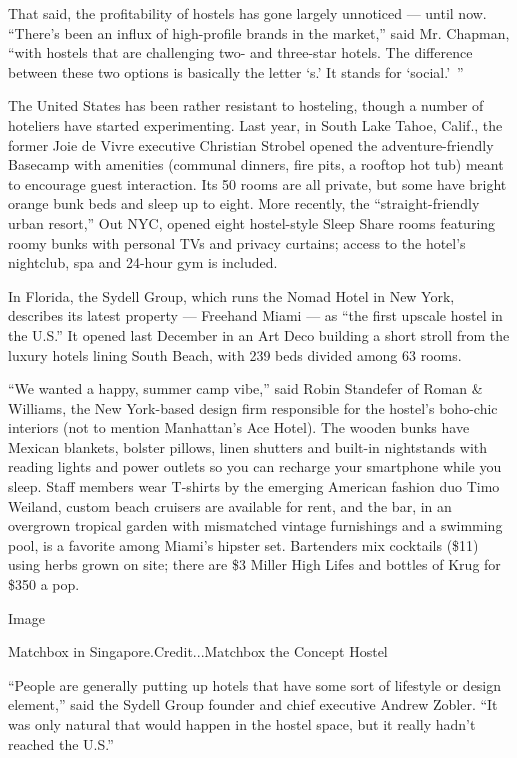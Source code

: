 That said, the profitability of hostels has gone largely unnoticed ---
until now. ``There's been an influx of high-profile brands in the
market,'' said Mr. Chapman, ``with hostels that are challenging two- and
three-star hotels. The difference between these two options is basically
the letter `s.' It stands for `social.'~''

The United States has been rather resistant to hosteling, though a
number of hoteliers have started experimenting. Last year, in South Lake
Tahoe, Calif., the former Joie de Vivre executive Christian Strobel
opened the adventure-friendly Basecamp with amenities (communal dinners,
fire pits, a rooftop hot tub) meant to encourage guest interaction. Its
50 rooms are all private, but some have bright orange bunk beds and
sleep up to eight. More recently, the ``straight-friendly urban
resort,'' Out NYC, opened eight hostel-style Sleep Share rooms featuring
roomy bunks with personal TVs and privacy curtains; access to the
hotel's nightclub, spa and 24-hour gym is included.

In Florida, the Sydell Group, which runs the Nomad Hotel in New York,
describes its latest property --- Freehand Miami --- as ``the first
upscale hostel in the U.S.'' It opened last December in an Art Deco
building a short stroll from the luxury hotels lining South Beach, with
239 beds divided among 63 rooms.

``We wanted a happy, summer camp vibe,'' said Robin Standefer of Roman
\& Williams, the New York-based design firm responsible for the hostel's
boho-chic interiors (not to mention Manhattan's Ace Hotel). The wooden
bunks have Mexican blankets, bolster pillows, linen shutters and
built-in nightstands with reading lights and power outlets so you can
recharge your smartphone while you sleep. Staff members wear T-shirts by
the emerging American fashion duo Timo Weiland, custom beach cruisers
are available for rent, and the bar, in an overgrown tropical garden
with mismatched vintage furnishings and a swimming pool, is a favorite
among Miami's hipster set. Bartenders mix cocktails (\$11) using herbs
grown on site; there are \$3 Miller High Lifes and bottles of Krug for
\$350 a pop.

Image

Matchbox in Singapore.Credit...Matchbox the Concept Hostel

``People are generally putting up hotels that have some sort of
lifestyle or design element,'' said the Sydell Group founder and chief
executive Andrew Zobler. ``It was only natural that would happen in the
hostel space, but it really hadn't reached the U.S.''

